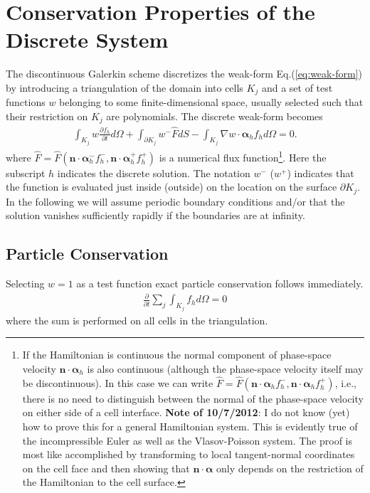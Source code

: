\documentclass[11pt, reqno]{amsart}
\newcommand{\eqr}[1]{Eq.\thinspace(#1)}
\newcommand{\pfrac}[2]{\frac{\partial #1}{\partial #2}}
\newcommand{\mvec}[1]{\mathbf{#1}}
\newcommand{\gvec}[1]{\boldsymbol{#1}}
\theoremstyle{definition}
\begin{document}
\section{Conservation Properties of the Discrete System}

The discontinuous Galerkin scheme discretizes the weak-form
\eqr{\ref{eq:weak-form}} by introducing a triangulation of the domain
into cells $K_j$ and a set of test functions $w$ belonging to some
finite-dimensional space, usually selected such that their restriction
on $K_j$ are polynomials. The discrete weak-form becomes
\begin{align}
  \int_{K_j} w\pfrac{f_h}{t}d\Omega + 
  \int_{\partial K_j}w^-
  \hat{F}dS 
  - \int_{K_j}
  \nabla w \cdot \gvec{\alpha}_h
  f_h d\Omega = 0. \label{eq:dis-weak-form}
\end{align}
where $\hat{F} = \hat{F}(\mvec{n}\cdot\gvec{\alpha}_h^- f_h^-,
\mvec{n}\cdot\gvec{\alpha}_h^+ f_h^+)$ is a numerical flux
function\footnote{If the Hamiltonian is continuous the normal
  component of phase-space velocity $\mvec{n}\cdot\gvec{\alpha}_h$ is
  also continuous (although the phase-space velocity itself may be
  discontinuous). In this case we can write $\hat{F} =
  \hat{F}(\mvec{n}\cdot\gvec{\alpha}_h f_h^-,
  \mvec{n}\cdot\gvec{\alpha}_h f_h^+)$, i.e., there is no need to
  distinguish between the normal of the phase-space velocity on either
  side of a cell interface. {\bf Note of 10/7/2012}: I do not know
  (yet) how to prove this for a general Hamiltonian system. This is
  evidently true of the incompressible Euler as well as the
  Vlasov-Poisson system. The proof is most like accomplished by
  transforming to local tangent-normal coordinates on the cell face
  and then showing that $\mvec{n}\cdot\gvec{\alpha}$ only depends on
  the restriction of the Hamiltonian to the cell surface.}. Here the
subscript $h$ indicates the discrete solution. The notation $w^-$
($w^+$) indicates that the function is evaluated just inside (outside)
on the location on the surface $\partial K_j$. In the following we
will assume periodic boundary conditions and/or that the solution
vanishes sufficiently rapidly if the boundaries are at infinity.

\subsection{Particle Conservation}

Selecting $w=1$ as a test function exact particle conservation follows
immediately.
\begin{align}
  \frac{\partial }{\partial t}\sum_j \int_{K_j} f_hd\Omega
  =
  0
\end{align}
where the sum is performed on all cells in the triangulation.
\end{document}
